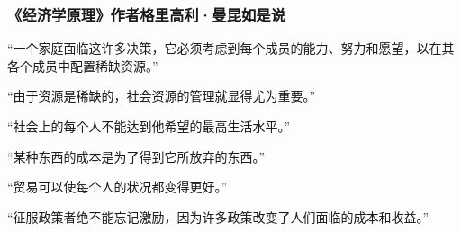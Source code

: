 \subsubsection*{《经济学原理》作者格里高利·曼昆如是说}

“一个家庭面临这许多决策，它必须考虑到每个成员的能力、努力和愿望，以在其各个成员中配置稀缺资源。”
\par

“由于资源是稀缺的，社会资源的管理就显得尤为重要。”
\par

“社会上的每个人不能达到他希望的最高生活水平。”
\par

“某种东西的成本是为了得到它所放弃的东西。”
\par

“贸易可以使每个人的状况都变得更好。”
\par

“征服政策者绝不能忘记激励，因为许多政策改变了人们面临的成本和收益。”
\par
